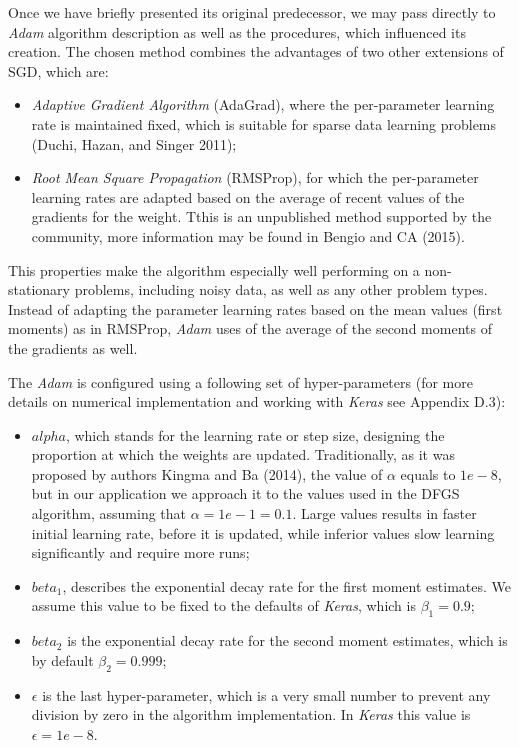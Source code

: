 \documentclass[12pt,]{article}
\providecommand{\tightlist}{%
  \setlength{\itemsep}{0pt}\setlength{\parskip}{0pt}}
\begin{document}
Once we have briefly presented its original predecessor, we may pass
directly to \emph{Adam} algorithm description as well as the procedures,
which influenced its creation. The chosen method combines the advantages
of two other extensions of SGD, which are:

\begin{itemize}
\tightlist
\item
  \emph{Adaptive Gradient Algorithm} (AdaGrad), where the per-parameter
  learning rate is maintained fixed, which is suitable for sparse data
  learning problems (Duchi, Hazan, and Singer 2011);
\item
  \emph{Root Mean Square Propagation} (RMSProp), for which the
  per-parameter learning rates are adapted based on the average of
  recent values of the gradients for the weight. Tthis is an unpublished
  method supported by the community, more information may be found in
  Bengio and CA (2015).
\end{itemize}

This properties make the algorithm especially well performing on a
non-stationary problems, including noisy data, as well as any other
problem types. Instead of adapting the parameter learning rates based on
the mean values (first moments) as in RMSProp, \emph{Adam} uses of the
average of the second moments of the gradients as well.

The \emph{Adam} is configured using a following set of hyper-parameters
(for more details on numerical implementation and working with
\emph{Keras} see Appendix D.3):

\begin{itemize}
\tightlist
\item
  \(alpha\), which stands for the learning rate or step size, designing
  the proportion at which the weights are updated. Traditionally, as it
  was proposed by authors Kingma and Ba (2014), the value of \(\alpha\)
  equals to \(1e-8\), but in our application we approach it to the
  values used in the DFGS algorithm, assuming that
  \(\alpha = 1e-1 = 0.1\). Large values results in faster initial
  learning rate, before it is updated, while inferior values slow
  learning significantly and require more runs;
\item
  \(beta_1\), describes the exponential decay rate for the first moment
  estimates. We assume this value to be fixed to the defaults of
  \emph{Keras}, which is \(\beta_1 = 0.9\);
\item
  \(beta_2\) is the exponential decay rate for the second moment
  estimates, which is by default \(\beta_2 = 0.999\);
\item
  \(\epsilon\) is the last hyper-parameter, which is a very small number
  to prevent any division by zero in the algorithm implementation. In
  \emph{Keras} this value is \(\epsilon = 1e-8\).
\end{itemize}
\end{document}
